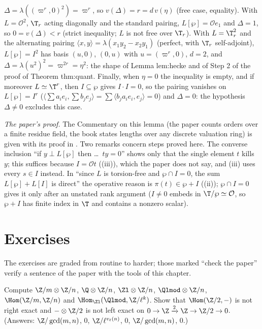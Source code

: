 \begin{remark}
$\Delta=\lambda((\varpi^r,0)^2)=\varpi^r$, so $v(\Delta)=r=d\,v(\eta)$ (free case, equality). With $L=\mathcal O^2$, $\T_r$ acting diagonally and the standard pairing, $L[\wp]=\mathcal Oe_1$
and $\Delta=1$, so $0=v(\Delta)<r$ (strict inequality; $L$ is not free over $\T_r$). With $L=\T_r^2$ and the alternating pairing $\langle x,y\rangle=\lambda(x_1y_2-x_2y_1)$ (perfect, with
$\T_r$ self-adjoint), $L[\wp]=I^2$ has basis $(u,0)$, $(0,u)$ with $u=(\varpi^r,0)$, $d=2$, and $\Delta=\lambda(u^2)^2=\varpi^{2r}=\eta^2$: the shape of Lemma lem:hecke and of Step 2 of the
proof of Theorem thm:quant. Finally, when $\eta=0$ the inequality is empty, and if moreover $L\simeq\T^r$, then $I\subseteq\wp$ gives $I\cdot I=0$, so the pairing vanishes on
$L[\wp]=I^r$ ($\langle\sum a_ie_i,\sum b_je_j\rangle=\sum\langle b_ja_ie_i,e_j\rangle=0$) and $\Delta=0$: the hypothesis $\Delta\ne0$ excludes this case.

\emph{The paper's proof.} The Commentary on this lemma (the paper counts orders over a finite residue field, the
book states lengths over any discrete valuation ring) is given with its proof in . Two remarks concern steps proved here.
The converse inclusion ``if $y\perp L[\wp]$ then \dots\ $ty=0$'' shows only that the single element $t$ kills $y$; this suffices because $I=\mathcal Ot$
((iii)), which the paper does not say, and (iii) uses every $s\in I$ instead. In
``since $L$ is torsion-free and $\wp\cap I=0$, the sum $L[\wp]+L[I]$ is direct'' the operative reason is $\pi(t)\in\wp+I$
((ii)); $\wp\cap I=0$ gives it only after an unstated rank argument ($I\ne0$ embeds in $\T/\wp\simeq\mathcal O$, so
$\wp+I$ has finite index in $\T$ and contains a nonzero scalar).
\end{remark}

\section{Exercises}\label{sec:modules:exercises}

The exercises are graded from routine to harder; those marked ``check the paper'' verify a sentence of the paper with the tools of this chapter.

\begin{exercise}\label{ex:modules:ex-tensor}
Compute $\Z/m\otimes\Z/n$, $\Q\otimes\Z/n$, $\Zl\otimes\Z/n$, $\Qlmod\otimes\Z/n$, $\Hom(\Z/m,\Z/n)$ and $\Hom_{\Zl}(\Qlmod,\Z/\ell^k)$. Show that $\Hom(\Z/2,-)$ is not right exact
and $-\otimes\Z/2$ is not left exact on $0\to\Z\xrightarrow2\Z\to\Z/2\to0$. (Answers: $\Z/\gcd(m,n)$, $0$, $\Z/\ell^{v_\ell(n)}$, $0$, $\Z/\gcd(m,n)$, $0$.)
\end{exercise}


